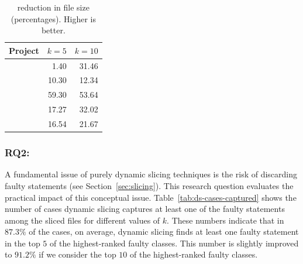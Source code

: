 \documentclass{article}
\begin{document}
\begin{table}[h]
  \small
	\centering
	\setlength{\tabcolsep}{4pt}
	\begin{tabular}{lrr}
		\toprule
		Project             &  \multicolumn{1}{c}{$k=5$} & \multicolumn{1}{c}{$k=10$} \\ %
		\midrule

        \lang{}            & 1.40 & 31.46\\
        \cmath{}           & 10.30 & 12.34\\
		\chart{}			& 59.30 & 53.64 \\
        \jtime{}            & 17.27 & 32.02\\
        \mockito{}          & 16.54 & 21.67\\

		\bottomrule
	\end{tabular}
	\caption {\ds{} reduction in file size (percentages). Higher is better.}
	\label{tab:red}
\end{table}
\normalsize

\subsubsection{RQ2: \textit{\rqtwo}}
\label{rq:2}






A fundamental issue of purely dynamic slicing techniques is the risk
of discarding faulty statements (see Section~\ref{sec:slicing}). This
research question evaluates the practical impact of this conceptual
issue. Table~\ref{tab:ds-cases-captured} shows the number of cases
dynamic slicing captures at least one of the faulty statements among
the sliced files for different values of $k$. These numbers indicate
that in $87.3\%$ of the cases, on average, dynamic slicing finds at
least one faulty statement in the top $5$ of the highest-ranked faulty
classes. This number is slightly improved to $91.2\%$ if we consider
the top $10$ of the highest-ranked faulty classes.
\end{document}
